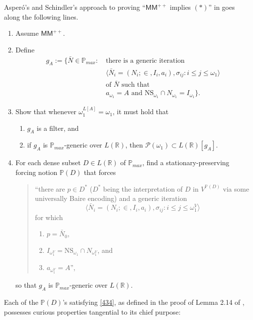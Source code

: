 \documentclass[12pt, twoside]{memoir}
\numberwithin{equation}{section}
\theoremstyle{definition}
\theoremstyle{remark}
\theoremstyle{definition}
\theoremstyle{definition}
\theoremstyle{definition}
\theoremstyle{remark}
\begin{document}
Asper\'{o}'s and Schindler's approach to proving ``$\mathsf{MM}^{++}$ implies $(*)$'' in \cite{schindler} goes along the following lines. 
\begin{enumerate}[label=(\arabic*)]
    \item Assume $\mathsf{MM}^{++}$.
    \item Define 
    \begin{align*}
        g_A := \{\bar{N} \in \mathbb{P}_{max} : \ & \text{there is a generic iteration } \\ 
        & \langle \bar{N}_i = (N_i; \in, I_i, a_i), \sigma_{ij} : i \leq j \leq \omega_1 \rangle \\
        & \text{of } \bar{N} \text{ such that} \\
        & a_{\omega_1} = A \text{ and } \mathrm{NS}_{\omega_1} \cap N_{\omega_1} = I_{\omega_1}\} \text{.}
    \end{align*}
    \item Show that whenever $\omega_1^{L[A]} = \omega_1$, it must hold that
    \begin{enumerate}[label=(\alph*)]
        \item $g_A$ is a filter, and
        \item if $g_A$ is $\mathbb{P}_{max}$-generic over $L(\mathbb{R})$, then $\mathcal{P}(\omega_1) \subset L(\mathbb{R})[g_A]$.
    \end{enumerate}
    \item\label{434} For each dense subset $D \in L(\mathbb{R})$ of $\mathbb{P}_{max}$, find a stationary-preserving forcing notion $\mathbb{P}(D)$ that forces
    \begin{quote}
        ``there are $p \in D^*$ ($D^*$ being the interpretation of $D$ in $V^{\mathbb{P}(D)}$ via some universally Baire encoding) and a generic iteration $$\langle \bar{N}_i = (N_i; \in, I_i, a_i), \sigma_{ij} : i \leq j \leq \omega_1^V \rangle$$ for which
        \begin{enumerate}[label=(\alph*)]
            \item $p = \bar{N}_0$,
            \item $I_{\omega_1^V} = \mathrm{NS}_{\omega_1} \cap N_{\omega_1^V}$, and
            \item $a_{\omega_1^V} = A$'',
        \end{enumerate}
    \end{quote}
    so that $g_A$ is $\mathbb{P}_{max}$-generic over $L(\mathbb{R})$.
\end{enumerate}
Each of the $\mathbb{P}(D)$'s satisfying \ref{434}, as defined in the proof of Lemma 2.14 of \cite{schindler}, possesses curious properties tangential to its chief purpose:
\end{document}
